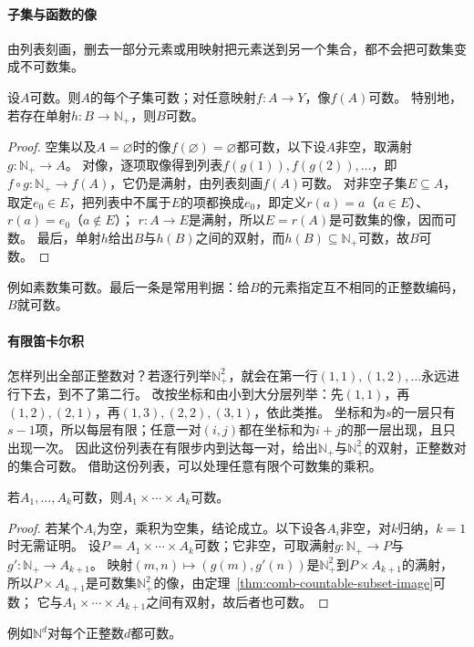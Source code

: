 \paragraph{子集与函数的像}
由列表刻画，删去一部分元素或用映射把元素送到另一个集合，都不会把可数集变成不可数集。
\begin{theorem}[子集与像的可数性]
\label{thm:comb-countable-subset-image}
设$A$可数。则$A$的每个子集可数；对任意映射$f:A\to Y$，像$f(A)$可数。
特别地，若存在单射$h:B\to\mathbb N_+$，则$B$可数。
\end{theorem}
\begin{proof}
空集以及$A=\varnothing$时的像$f(\varnothing)=\varnothing$都可数，以下设$A$非空，取满射$g:\mathbb N_+\to A$。
对像，逐项取像得到列表$f(g(1)),f(g(2)),\ldots$，即$f\circ g:\mathbb N_+\to f(A)$，它仍是满射，由列表刻画$f(A)$可数。
对非空子集$E\subseteq A$，取定$e_0\in E$，把列表中不属于$E$的项都换成$e_0$，即定义$r(a)=a$（$a\in E$）、$r(a)=e_0$（$a\notin E$）；
$r:A\to E$是满射，所以$E=r(A)$是可数集的像，因而可数。
最后，单射$h$给出$B$与$h(B)$之间的双射，而$h(B)\subseteq\mathbb N_+$可数，故$B$可数。
\end{proof}
例如素数集可数。最后一条是常用判据：给$B$的元素指定互不相同的正整数编码，$B$就可数。

\paragraph{有限笛卡尔积}
怎样列出全部正整数对？若逐行列举$\mathbb N_+^2$，就会在第一行$(1,1),(1,2),\ldots$永远进行下去，到不了第二行。
改按坐标和由小到大分层列举：先$(1,1)$，再$(1,2),(2,1)$，再$(1,3),(2,2),(3,1)$，依此类推。
坐标和为$s$的一层只有$s-1$项，所以每层有限；任意一对$(i,j)$都在坐标和为$i+j$的那一层出现，且只出现一次。
因此这份列表在有限步内到达每一对，给出$\mathbb N_+$与$\mathbb N_+^2$的双射，正整数对的集合可数。
借助这份列表，可以处理任意有限个可数集的乘积。
\begin{theorem}[有限笛卡尔积的可数性]
\label{thm:comb-countable-product}
若$A_1,\ldots,A_k$可数，则$A_1\times\cdots\times A_k$可数。
\end{theorem}
\begin{proof}
若某个$A_i$为空，乘积为空集，结论成立。以下设各$A_i$非空，对$k$归纳，$k=1$时无需证明。
设$P=A_1\times\cdots\times A_k$可数；它非空，可取满射$g:\mathbb N_+\to P$与$g':\mathbb N_+\to A_{k+1}$。
映射$(m,n)\mapsto(g(m),g'(n))$是$\mathbb N_+^2$到$P\times A_{k+1}$的满射，
所以$P\times A_{k+1}$是可数集$\mathbb N_+^2$的像，由定理~\ref{thm:comb-countable-subset-image}可数；
它与$A_1\times\cdots\times A_{k+1}$之间有双射，故后者也可数。
\end{proof}
例如$\mathbb N^d$对每个正整数$d$都可数。

